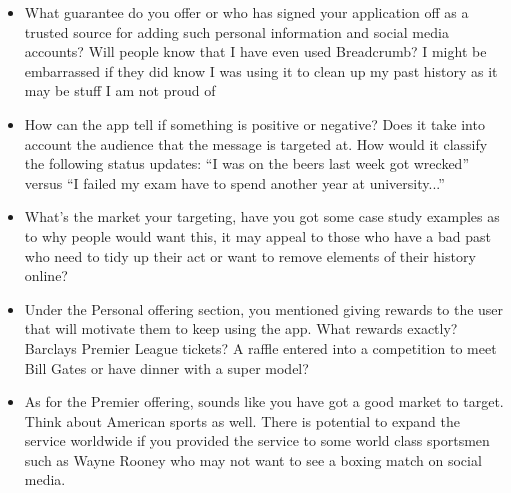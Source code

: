 	      \begin{itemize}
        \item What guarantee do you offer or who has signed your application off as a trusted source for adding such personal information and social media accounts? Will people know that I have even used Breadcrumb? I might be embarrassed if they did know I was using it to clean up my past history as it may be stuff I am not proud of
        \item How can the app tell if something is positive or negative? Does it take into account the audience that the message is targeted at. How would it classify the following status updates: "`I was on the beers last week got wrecked"' versus "`I failed my exam have to spend another year at university..."'
        \item What’s the market your targeting, have you got some case study examples as to why people would want this, it may appeal to those who have a bad past who need to tidy up their act or want to remove elements of their history online?
        \item Under the Personal offering section, you mentioned giving rewards to the user that will motivate them to keep using the app. What rewards exactly? Barclays Premier League tickets? A raffle entered into a competition to meet Bill Gates or have dinner with a super model?
        \item As for the Premier offering, sounds like you have got a good market to target. Think about American sports as well. There is potential to expand the service worldwide if you provided the service to some world class sportsmen such as Wayne Rooney who may not want to see a boxing match on social media.
      \end{itemize}
